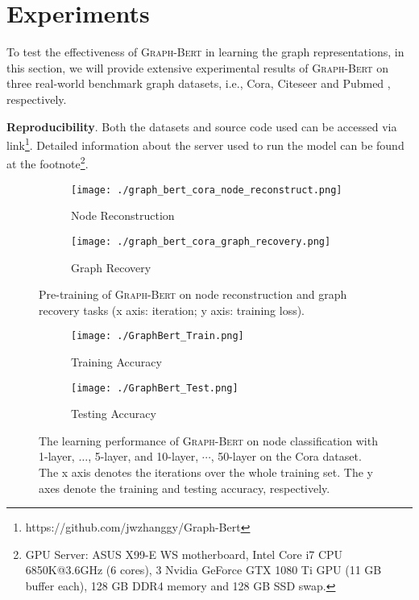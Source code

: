 \documentclass{article}
\newcommand{\our}{\textsc{Graph-Bert}}
\begin{document}
\section{Experiments}\label{sec:experiment}

To test the effectiveness of {\our} in learning the graph representations, in this section, we will provide extensive experimental results of {\our} on three real-world benchmark graph datasets, i.e., Cora, Citeseer and Pubmed \cite{YCS16}, respectively.

\noindent \textbf{Reproducibility}. Both the datasets and source code used can be accessed via link\footnote{https://github.com/jwzhanggy/Graph-Bert}. Detailed information about the server used to run the model can be found at the footnote\footnote{GPU Server: ASUS X99-E WS motherboard, Intel Core i7 CPU 6850K@3.6GHz (6 cores), 3 Nvidia GeForce GTX 1080 Ti GPU (11 GB buffer each), 128 GB DDR4 memory and 128 GB SSD swap.}.

\begin{figure}
    \centering
    \begin{subfigure}[b]{.23\textwidth}
    	\texttt{[image: ./graph\_bert\_cora\_node\_reconstruct.png]}
    	\caption{Node Reconstruction}\label{fig:acc_train}
    \end{subfigure}\hfill
    \begin{subfigure}[b]{.23\textwidth}
    	\texttt{[image: ./graph\_bert\_cora\_graph\_recovery.png]}
    	\caption{Graph Recovery}\label{fig:acc_test}
    \end{subfigure}\caption{Pre-training of {\our} on node reconstruction and graph recovery tasks (x axis: iteration; y axis: training loss).}\label{fig:graph_bert_pre_train}
\end{figure}


\begin{figure}[t]
    \centering
    \begin{subfigure}[b]{.23\textwidth}
    	\texttt{[image: ./GraphBert\_Train.png]}
    	\caption{Training Accuracy}\label{fig:acc_train}
    \end{subfigure}\hfill
    \begin{subfigure}[b]{.23\textwidth}
    	\texttt{[image: ./GraphBert\_Test.png]}
    	\caption{Testing Accuracy}\label{fig:acc_test}
    \end{subfigure}\caption{The learning performance of {\our} on node classification with 1-layer, $\dotsc$, 5-layer, and 10-layer, $\cdots$, 50-layer on the Cora dataset. The x axis denotes the iterations over the whole training set. The y axes denote the training and testing accuracy, respectively.}\label{fig:graph_bert_acc_analysis}
\end{figure}
\end{document}
